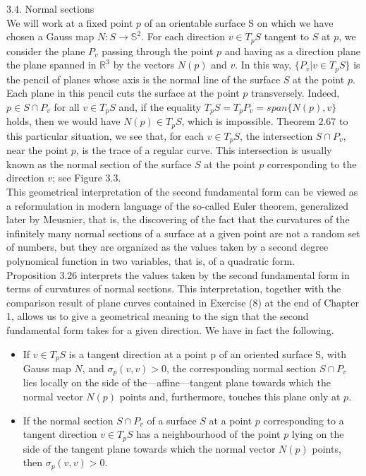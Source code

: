 3.4. Normal sections
${ }$\\

We will work at a fixed point $p$ of an orientable surface S on which we have chosen a Gauss map $N : S \to \mathbb{S}^2$. For each direction $v \in T_pS$ tangent to $S$ at $p$, we consider the plane $P_v$ passing through the point $p$ and having as a direction plane the plane spanned in $\mathbb{R}^3$ by the vectors $N(p)$ and $v$. In this way, $\{P_v | v \in T_pS\}$ is the pencil of planes whose axis is the normal line of the surface $S$ at the point $p$. Each plane in this pencil cuts the surface at the point $p$ transversely. Indeed, $p \in S \cap P_v$ for all $v \in T_pS$ and, if the equality $T_pS = T_pP_v = span \{N(p),v\}$ holds, then we would have $N(p) \in T_pS$, which is impossible. Theorem 2.67 to this particular situation, we see that, for each $v \in T_pS$, the intersection $S \cap P_v$, near the point $p$, is the trace of a regular curve. This intersection is usually known as the normal section of the surface $S$ at the point $p$ corresponding to the direction $v$; see Figure 3.3.
${ }$\\

This geometrical interpretation of the second fundamental form can be viewed as a reformulation in modern language of the so-called Euler theorem, generalized later by Meusnier, that is, the discovering of the fact that the curvatures of the infinitely many normal sections of a surface at a given point are not a random set of numbers, but they are organized as the values taken by a second degree polynomical function in two variables, that is, of a quadratic form.
${ }$\\

Proposition 3.26 interprets the values taken by the second fundamental form in terms of curvatures of normal sections. This interpretation, together with the comparison result of plane curves contained in Exercise (8) at the end of Chapter 1, allows us to give a geometrical meaning to the sign that the second fundamental form takes for a given direction. We have in fact the following.
${ }$\\

\begin{itemize}
	\item If $v \in T_pS$ is a tangent direction at a point p of an oriented surface S, with Gauss map $N$, and $\sigma_p(v,v) > 0$, the corresponding normal section $S \cap P_v$ lies locally on the side of the—affine—tangent plane towards which the normal vector $N(p)$ points and, furthermore, touches this plane only at $p$.
	\item If the normal section $S \cap P_v$ of a surface $S$ at a point $p$ corresponding to a tangent direction $v \in T_pS$ has a neighbourhood of the point $p$ lying on the side of the tangent plane towards which the normal vector $N(p)$ points, then $\sigma_p(v,v) > 0$.
\end{itemize}
${ }$\\

